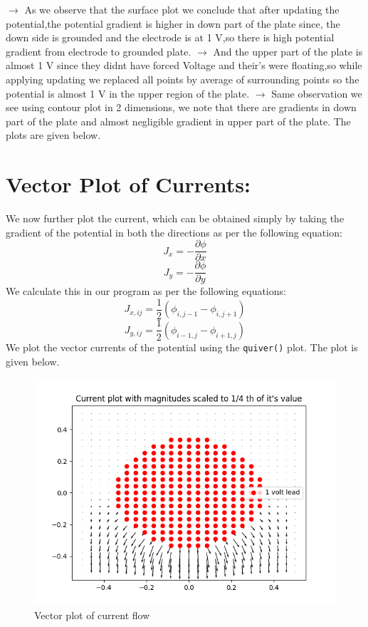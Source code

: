 \documentclass{article}
\begin{document}
$\rightarrow$  As we observe that the surface plot we conclude that after updating
  the potential,the potential gradient is higher in down part of the
  plate since, the down side is grounded and the electrode is at 1 V,so
  there is high potential gradient from electrode to grounded plate.
\newline
$\rightarrow$  And the upper part of the plate is almost 1 V since they didnt have
  forced Voltage and their's were floating,so while applying updating we
  replaced all points by average of surrounding points so the potential
  is almost 1 V in the upper region of the plate.
\newline
$\rightarrow$ Same observation we see using contour plot in 2 dimensions, we note
  that there are gradients in down part of the plate and almost
  negligible gradient in upper part of the plate.
  \newline  The plots are given below.
\clearpage

\section{Vector Plot of Currents:}
We now further plot the current, which can be obtained simply by taking the
gradient of the potential in both the directions as per the following equation:
\begin{equation}
    J_x = -\frac{\partial \phi}{\partial x} 
  \end{equation}
\begin{equation}
    J_y = -\frac{\partial \phi}{\partial y} 
  \end{equation}
We calculate this in our program as per the following equations:
\begin{equation}
        J_{x,ij} = \frac{1}{2}(\phi_{i,j-1} - \phi_{i,j+1}) 
    \end{equation}
\begin{equation}
        J_{y,ij} = \frac{1}{2}(\phi_{i-1,j} - \phi_{i+1,j}) 
    \end{equation}
We plot the vector currents of the potential using the \texttt{quiver()} plot. The plot is given below.
  \begin{figure}[!tbh]
   \centering
   \includegraphics[scale=0.8]{current.png}  
   \caption{Vector plot of current flow}
  \end{figure}
\end{document}
